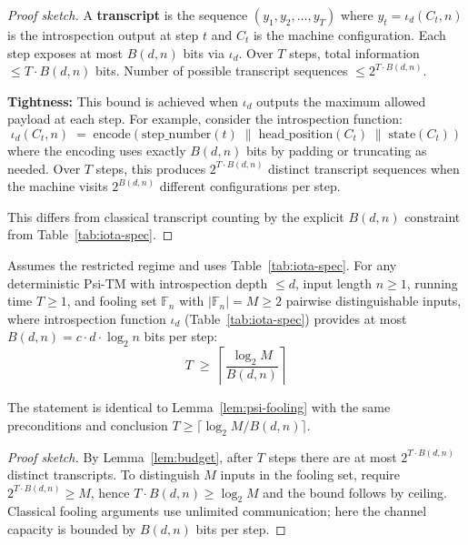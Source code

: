 \begin{proof}[Proof sketch]
A \textbf{transcript} is the sequence $(y_1, y_2, \ldots, y_T)$ where $y_t = \iota_d(C_t, n)$ is the introspection output at step $t$ and $C_t$ is the machine configuration. Each step exposes at most $B(d,n)$ bits via $\iota_d$. Over $T$ steps, total information $\leq T \cdot B(d,n)$ bits. Number of possible transcript sequences $\leq 2^{T \cdot B(d,n)}$.

\textbf{Tightness:} This bound is achieved when $\iota_d$ outputs the maximum allowed payload at each step. For example, consider the introspection function:
\[
\iota_d(C_t, n) \;=\; \text{encode}(\text{step\_number}(t) \;\|\; \text{head\_position}(C_t) \;\|\; \text{state}(C_t))
\]
where the encoding uses exactly $B(d,n)$ bits by padding or truncating as needed. Over $T$ steps, this produces $2^{T \cdot B(d,n)}$ distinct transcript sequences when the machine visits $2^{B(d,n)}$ different configurations per step.

This differs from classical transcript counting by the explicit $B(d,n)$ constraint from Table~\ref{tab:iota-spec}.
\end{proof}

\begin{lemma}
\label{lem:psi-fooling}
Assumes the restricted regime and uses Table~\ref{tab:iota-spec}.
For any deterministic Psi-TM with introspection depth $\leq d$, input length $n \geq 1$, running time $T \geq 1$, and fooling set $\mathbb{F}_n$ with $|\mathbb{F}_n| = M \geq 2$ pairwise distinguishable inputs, where introspection function $\iota_d$ (Table~\ref{tab:iota-spec}) provides at most $B(d,n) = c \cdot d \cdot \log_{2} n$ bits per step:
\begin{equation}
\label{eq:fooling-bound}
 T \;\geq\; \left\lceil \frac{\log_{2} M}{B(d,n)} \right\rceil
\end{equation}
\end{lemma}

\begin{theorem}
\label{thm:psi-fooling}\label{Lk:psi-fooling}
The statement is identical to Lemma~\ref{lem:psi-fooling} with the same preconditions and conclusion $T\ge \lceil \log_{2} M / B(d,n)\rceil$.
\end{theorem}

\begin{proof}[Proof sketch]
By Lemma~\ref{lem:budget}, after $T$ steps there are at most $2^{T \cdot B(d,n)}$ distinct transcripts. To distinguish $M$ inputs in the fooling set, require $2^{T \cdot B(d,n)} \ge M$, hence $T \cdot B(d,n) \ge \log_{2} M$ and the bound follows by ceiling. Classical fooling arguments use unlimited communication; here the channel capacity is bounded by $B(d,n)$ bits per step.
\end{proof}


